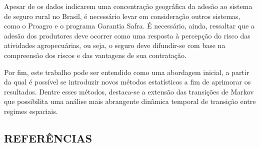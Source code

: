 \documentclass[12pt,a4paper]{article}
\begin{document}
Apesar de os dados indicarem uma concentração geográfica da adesão ao sistema de seguro rural no Brasil, é necessário levar em consideração outros sistemas, como o Proagro e o programa Garantia Safra. É necessário, ainda, ressaltar que a adesão dos produtores deve ocorrer como uma resposta à percepção do risco das atividades agropecuárias, ou seja, o seguro deve difundir-se com base na compreensão dos riscos e das vantagens de sua contratação. 

Por fim, este trabalho pode ser entendido como uma abordagem inicial, a partir da qual é possível se introduzir novos métodos estatísticos a fim de aprimorar os resultados. Dentre esses métodos, destaca-se a extensão das transições de Markov que possibilita uma análise mais abrangente dinâmica temporal de transição entre regimes espaciais. 

\newpage
{}
\begin{center}
\section*{REFERÊNCIAS} 
\end{center}

\begin{singlespace}
\begin{flushleft}
\renewcommand\refname{}
\vspace*{-1.5cm}

\end{flushleft}
\end{singlespace}


\end{document}
